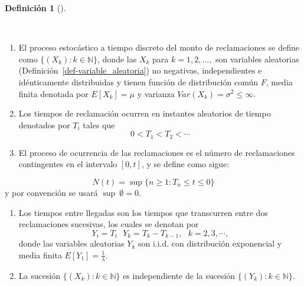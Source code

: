 \documentclass[
  us-letterpaper,
]{scrreprt}
\theoremstyle{definition}
\newtheorem{definition}{Definición}[chapter]
\theoremstyle{plain}
\theoremstyle{plain}
\theoremstyle{remark}
\begin{document}
\begin{definition}[]\protect\hypertarget{def-1}{}\label{def-1}

~

\begin{enumerate}
\def\labelenumi{\arabic{enumi}.}
\item
  El proceso estocástico a tiempo discreto del monto de reclamaciones se
  define como \(\{(X_k): {k \in \mathbb{N} }\}\), donde las \(X_k\) para
  \(k = 1, 2, ...,\) son variables aleatorias
  (Definición~\ref{def-variable_aleatoria}) no negativas, independientes
  e idénticamente distribuidas y tienen función de distribución común
  \(F\), media finita denotada por \(E[X_k] = \mu\) y varianza
  \(Var(X_k) = \sigma^2 \leq \infty\).
\item
  Los tiempos de reclamación ocurren en instantes aleatorios de tiempo
  denotados por \(T_i\) tales que \[ 0 < T_1 < T_2 < \dotsb\]
\item
  El proceso de ocurrencia de las reclamaciones es el número de
  reclamaciones contingentes en el intervalo \([0,t]\), y se define como
  sigue:
\end{enumerate}

\[N(t) = \sup \{n \geq 1: T_n \leq t  \leq 0\}\] y por convención se
usará \(\sup \ \emptyset = 0\).

\begin{enumerate}
\def\labelenumi{\arabic{enumi}.}
\setcounter{enumi}{3}
\item
  Los tiempos entre llegadas son los tiempos que transcurren entre dos
  reclamaciones sucesivas, los cuales se denotan por
  \[Y_i = T_i \ \ \ Y_k= T_k - T_{k-1}, \ \ \ k = 2,3, \dotsb,\]donde
  las variables aleatorias \(Y_k\) son i.i.d. con distribución
  exponencial y media finita \(E[Y_1] =\frac{1}{\lambda}\).
\item
  La sucesión \(\{(X_k): k \in \mathbb{N}\}\) es independiente de la
  sucesión \(\{(Y_k):k\in \mathbb{N}\}.\)
\end{enumerate}

\end{definition}
\end{document}
